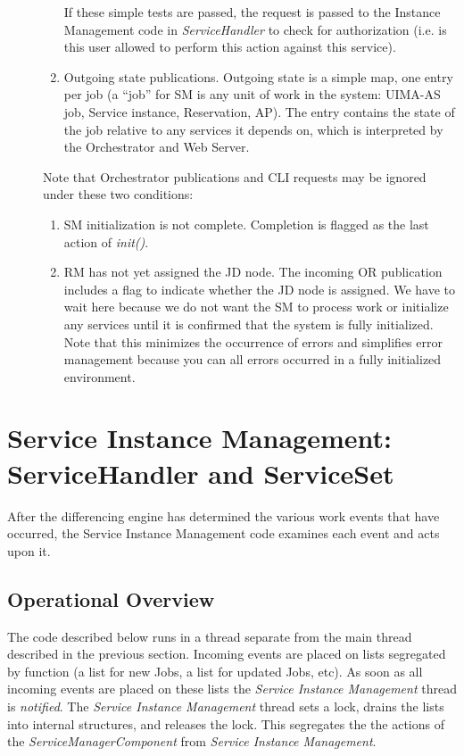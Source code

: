 \begin{description}
\begin{enumerate}
             If these simple tests are passed, the request is passed to the Instance Management
             code in {\em ServiceHandler} to check for authorization (i.e. is this user allowed
             to perform this action against this service).  

           \item Outgoing state publications.  Outgoing state is a simple map, one entry per
             job (a ``job'' for SM is any unit of work in the system: UIMA-AS job, Service instance,
             Reservation, AP).  The entry contains the state of the job relative to any
             services it depends on, which is interpreted by the Orchestrator and Web Server.

         \end{enumerate}

         Note that Orchestrator publications and CLI requests may be ignored under these two conditions:       
         \begin{enumerate}
         \item SM initialization is not complete.  Completion is flagged as the last
           action of {\em init()}.
         \item RM has not yet assigned the JD node.  The incoming OR publication includes a flag to
           indicate whether the JD node is assigned.  We have to wait here because we do not want
           the SM to process work or initialize any services until it is confirmed that the system
           is fully initialized.  Note that this minimizes the occurrence of errors and simplifies
           error management because you can all errors occurred in a fully initialized environment.
         \end{enumerate}
         
     \end{description}
   

\section{Service Instance Management: ServiceHandler and ServiceSet}
    After the differencing engine has determined the various work events that have
    occurred, the Service Instance Management code examines each event
    and acts upon it.  

\subsection{Operational Overview}
    The code described below runs in a thread separate from the main thread
    described in the previous section.  Incoming events are placed on lists
    segregated by function (a list for new Jobs, a list for updated Jobs, etc).  As soon
    as all incoming events are placed on these lists the {\em Service Instance Management}
    thread is {\em notified}.  The {\em Service Instance Management} thread sets a lock,
    drains the lists into internal structures, and releases the lock.  This segregates the
    the actions of the {\em ServiceManagerComponent} from {\em Service Instance Management}.

